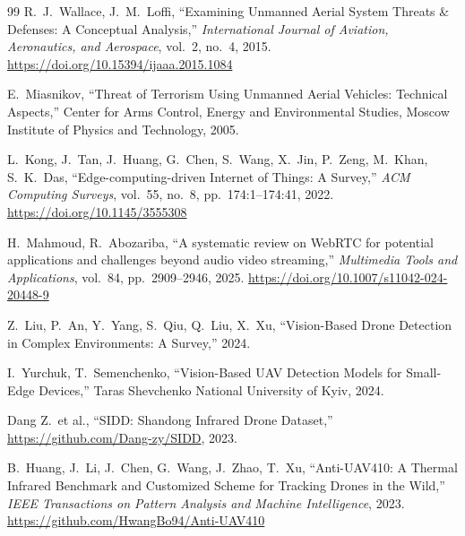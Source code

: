 \documentclass[12pt,a4paper]{report}
\begin{document}
\begin{thebibliography}{99}
R.\ J.\ Wallace, J.\ M.\ Loffi,
``Examining Unmanned Aerial System Threats \& Defenses: A Conceptual Analysis,''
\textit{International Journal of Aviation, Aeronautics, and Aerospace},
vol.\ 2, no.\ 4, 2015.
\url{https://doi.org/10.15394/ijaaa.2015.1084}

E.\ Miasnikov,
``Threat of Terrorism Using Unmanned Aerial Vehicles: Technical Aspects,''
Center for Arms Control, Energy and Environmental Studies,
Moscow Institute of Physics and Technology, 2005.

L.\ Kong, J.\ Tan, J.\ Huang, G.\ Chen, S.\ Wang, X.\ Jin, P.\ Zeng, M.\ Khan, S.\ K.\ Das,
``Edge-computing-driven Internet of Things: A Survey,''
\textit{ACM Computing Surveys}, vol.\ 55, no.\ 8, pp.\ 174:1--174:41, 2022.
\url{https://doi.org/10.1145/3555308}

H.\ Mahmoud, R.\ Abozariba,
``A systematic review on {WebRTC} for potential applications and
challenges beyond audio video streaming,''
\textit{Multimedia Tools and Applications}, vol.\ 84, pp.\ 2909--2946, 2025.
\url{https://doi.org/10.1007/s11042-024-20448-9}

Z.\ Liu, P.\ An, Y.\ Yang, S.\ Qiu, Q.\ Liu, X.\ Xu,
``Vision-Based Drone Detection in Complex Environments: A Survey,''
2024.

I.\ Yurchuk, T.\ Semenchenko,
``Vision-Based {UAV} Detection Models for Small-Edge Devices,''
Taras Shevchenko National University of Kyiv, 2024.

Dang Z.\ et al.,
``SIDD: Shandong Infrared Drone Dataset,''
\url{https://github.com/Dang-zy/SIDD}, 2023.

B.\ Huang, J.\ Li, J.\ Chen, G.\ Wang, J.\ Zhao, T.\ Xu,
``Anti-UAV410: A Thermal Infrared Benchmark and Customized Scheme
for Tracking Drones in the Wild,''
\textit{IEEE Transactions on Pattern Analysis and Machine Intelligence},
2023.
\url{https://github.com/HwangBo94/Anti-UAV410}

\end{thebibliography}
\end{document}
